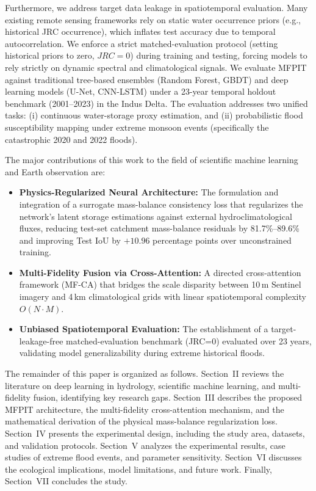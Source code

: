 \documentclass[journal]{IEEEtran}
\begin{document}
Furthermore, we address target data leakage in spatiotemporal evaluation. Many existing remote sensing frameworks rely on static water occurrence priors (e.g., historical JRC occurrence), which inflates test accuracy due to temporal autocorrelation. We enforce a strict matched-evaluation protocol (setting historical priors to zero, $JRC=0$) during training and testing, forcing models to rely strictly on dynamic spectral and climatological signals. We evaluate MFPIT against traditional tree-based ensembles (Random Forest, GBDT) and deep learning models (U-Net, CNN-LSTM) under a 23-year temporal holdout benchmark (2001--2023) in the Indus Delta. The evaluation addresses two unified tasks: (i) continuous water-storage proxy estimation, and (ii) probabilistic flood susceptibility mapping under extreme monsoon events (specifically the catastrophic 2020 and 2022 floods).

The major contributions of this work to the field of scientific machine learning and Earth observation are:
\begin{itemize}
    \item \textbf{Physics-Regularized Neural Architecture:} The formulation and integration of a surrogate mass-balance consistency loss that regularizes the network's latent storage estimations against external hydroclimatological fluxes, reducing test-set catchment mass-balance residuals by 81.7\%--89.6\% and improving Test IoU by $+10.96$ percentage points over unconstrained training.
    \item \textbf{Multi-Fidelity Fusion via Cross-Attention:} A directed cross-attention framework (MF-CA) that bridges the scale disparity between 10\,m Sentinel imagery and 4\,km climatological grids with linear spatiotemporal complexity $O(N \cdot M)$.
    \item \textbf{Unbiased Spatiotemporal Evaluation:} The establishment of a target-leakage-free matched-evaluation benchmark (JRC=0) evaluated over 23 years, validating model generalizability during extreme historical floods.
\end{itemize}

The remainder of this paper is organized as follows. Section~II reviews the literature on deep learning in hydrology, scientific machine learning, and multi-fidelity fusion, identifying key research gaps. Section~III describes the proposed MFPIT architecture, the multi-fidelity cross-attention mechanism, and the mathematical derivation of the physical mass-balance regularization loss. Section~IV presents the experimental design, including the study area, datasets, and validation protocols. Section~V analyzes the experimental results, case studies of extreme flood events, and parameter sensitivity. Section~VI discusses the ecological implications, model limitations, and future work. Finally, Section~VII concludes the study.
\end{document}
